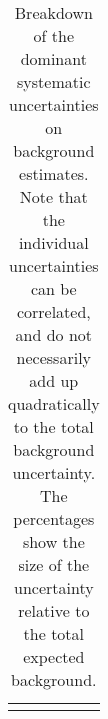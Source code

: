 \begin{table}
\begin{center}
\begin{tabular*}{\textwidth}{@{\extracolsep{\fill}}lccc}
\noalign{\smallskip}\hline\noalign{\smallskip}
\end{tabular*}
\end{center}
\caption[Breakdown of uncertainty on background estimates]{
Breakdown of the dominant systematic uncertainties on background estimates.
Note that the individual uncertainties can be correlated, and do not necessarily add up quadratically to 
the total background uncertainty. The percentages show the size of the uncertainty relative to the total expected background.
\label{table.results.bkgestimate.uncertainties.SRC1_SRC2_SRC3}}
\end{table}
%